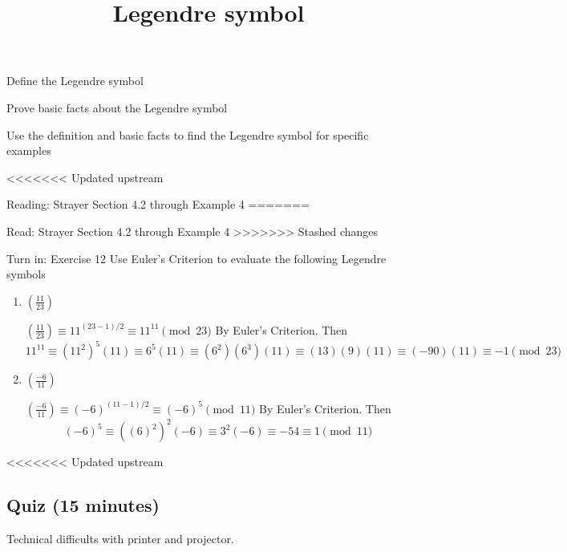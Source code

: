 \documentclass{ximera}
\title{Legendre symbol}
\begin{document}
\begin{abstract}
\end{abstract}
\maketitle


\begin{obj}
    \item Define the Legendre symbol
    \item Prove basic facts about the Legendre symbol
    \item Use the definition and basic facts to find the Legendre symbol for specific examples
\end{obj}


\begin{pre}
<<<<<<< Updated upstream
    \item[Reading:] Strayer Section 4.2 through Example 4
=======
    \item[Read:] Strayer Section 4.2 through Example 4
>>>>>>> Stashed changes
    \item[Turn in:] Exercise 12
     Use Euler's Criterion to evaluate the following Legendre symbols 
	\begin{enumerate}
 		\item $\left(\frac{11}{23}\right)$
		
		\begin{solution}
 			$\left(\frac{11}{23}\right)\equiv 11^{(23-1)/2}\equiv 11^{11}\pmod{23}$ By Euler's Criterion. Then
			\[11^{11}\equiv (11^{2})^{5}(11)\equiv 6^5(11)\equiv (6^2)(6^3)(11)\equiv (13)(9)(11)\equiv(-90)(11)\equiv -1\pmod{23}\]
		\end{solution}
		
		\item $\left(\frac{-6}{11}\right)$
		
		\begin{solution}
 			$\left(\frac{-6}{11}\right)\equiv (-6)^{(11-1)/2}\equiv (-6)^{5}\pmod{11}$ By Euler's Criterion. Then
			\[(-6)^{5}\equiv ((6)^{2})^{2}(-6)\equiv 3^2(-6)\equiv -54 \equiv 1\pmod{11}\]
		\end{solution}
	\end{enumerate}
 

<<<<<<< Updated upstream
    \end{pre}


\subsection{Quiz (15 minutes)}
Technical difficults with printer and projector.
\end{document}
